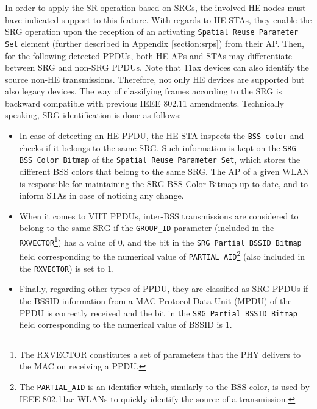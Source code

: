 \documentclass[comsoc]{IEEEtran}
\begin{document}
	In order to apply the SR operation based on SRGs, the involved HE nodes must have indicated support to this feature. With regards to HE STAs, they enable the SRG operation upon the reception of an activating \texttt{Spatial Reuse Parameter Set} element (further described in Appendix \ref{section:srps}) from their AP. Then, for the following detected PPDUs, both HE APs and STAs may differentiate between SRG and non-SRG PPDUs. Note that 11ax devices can also identify the source non-HE transmissions. Therefore, not only HE devices are supported but also legacy devices. The way of classifying frames according to the SRG is backward compatible with previous IEEE 802.11 amendments. Technically speaking, SRG identification is done as follows:
	\begin{itemize}
		\item In case of detecting an HE PPDU, the HE STA inspects the \texttt{BSS color} and checks if it belongs to the same SRG. Such information is kept on the \texttt{SRG BSS Color Bitmap} of the \texttt{Spatial Reuse Parameter Set}, which stores the different BSS colors that belong to the same SRG. The AP of a given WLAN is responsible for maintaining the SRG BSS Color Bitmap up to date, and to inform STAs in case of noticing any change.
		\item When it comes to VHT PPDUs, inter-BSS transmissions are considered to belong to the same SRG if the \texttt{GROUP\_ID} parameter (included in the \texttt{RXVECTOR}\footnote{The RXVECTOR constitutes a set of parameters that the PHY delivers to the MAC on receiving a PPDU.}) has a value of 0, and the bit in the \texttt{SRG Partial BSSID Bitmap} field corresponding to the numerical value of \texttt{PARTIAL\_AID}\footnote{The \texttt{PARTIAL\_AID} is an identifier which, similarly to the BSS color, is used by IEEE 802.11ac WLANs to quickly identify the source of a transmission.} (also included in the \texttt{RXVECTOR}) is set to 1. 
		\item Finally, regarding other types of PPDU, they are classified as SRG PPDUs if the BSSID information from a MAC Protocol Data Unit (MPDU) of the PPDU is correctly received and the bit in the \texttt{SRG Partial BSSID Bitmap} field corresponding to the numerical value of BSSID is 1.
	\end{itemize}
	
\end{document}
